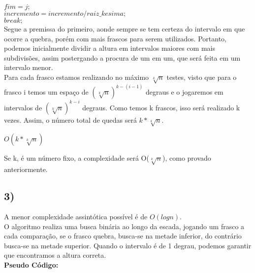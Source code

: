 \documentclass[10pt,a4paper]{article}
\begin{document}
	\hspace{4cm}$fim = j;$\\
	
	\hspace{4cm}$incremento = incremento/raiz\_kesima;$\\
	
	\hspace{4cm}$break;$\\
	
	
	Segue a premissa do primeiro, aonde sempre se tem certeza do intervalo em que ocorre a quebra, porém com mais frascos para serem utilizados. Portanto, podemos inicialmente dividir a altura em intervalos maiores com mais subdivisões, assim postergando a procura de um em um, que será feita em um intervalo menor.\\
	
	Para cada frasco estamos realizando no máximo $\sqrt[k]{n}$ testes, visto que para o frasco i temos um espaço de $(\sqrt[k]{n})^{k-(i-1)}$ degraus e o jogaremos em intervalos de $(\sqrt[k]{n})^{k-i}$ degraus. Como temos k frascos, isso será realizado k vezes. Assim, o número total de quedas será $k * \sqrt[k]{n}$.\\
	
	\begin{center}
	
		$O(k*\sqrt[k]{n})$\\
	\end{center}
	
	Se k, é um número fixo, a complexidade será O($\sqrt[k]{n}$), como provado anteriormente.\\
	
	
	\subsection*{3)}
	
	\vspace{0.5cm}
	
	\tab A menor complexidade assintótica possível é de $O(log n)$.\\

O algoritmo realiza uma busca binária ao longo da escada, jogando um frasco a cada comparação, se o frasco quebra, busca-se na metade inferior, do contrário busca-se na metade superior. Quando o intervalo é de 1 degrau, podemos garantir que encontramos a altura correta.\\


\textbf{Pseudo Código: }\\
\end{document}
